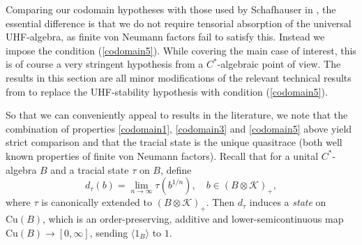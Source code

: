 \documentclass[reqno]{amsart}
\theoremstyle{definition}
\theoremstyle{remark}
\numberwithin{equation}{section}
\theoremstyle{definition}
\newcommand{\calK}{\mathcal{K}}
\begin{document}
Comparing our codomain hypotheses with those used by Schafhauser in \cite{Schafhauser.Annals}, the essential difference is that we do not require tensorial absorption of the universal UHF-algebra, as finite von Neumann factors fail to satisfy this. Instead we impose the condition (\ref{codomain5}). While covering the main case of interest, this is of course a very stringent hypothesis from a $C^*$-algebraic point of view.  The results in this section are all minor modifications of the relevant technical results from \cite{new-TWW,Schafhauser.Annals} to replace the UHF-stability hypothesis with condition (\ref{codomain5}).

So that we can conveniently appeal to results in the literature, we note that the combination of properties \eqref{codomain1}, \eqref{codomain3} and \eqref{codomain5} above yield strict comparison and that the tracial state is the unique quasitrace (both well known properties of finite von Neumann factors). Recall that for a unital $C^*$-algebra $B$ and a tracial state $\tau$ on $B$, define 
\begin{equation}
d_{\tau} (b) = \lim_{n\rightarrow \infty} \tau (b^{1/n}), \quad b\in (B\otimes \calK)_{+}, 
\end{equation} 
where $\tau$ is canonically extended to $(B\otimes \calK)_{+}$. Then $d_{\tau}$ induces a \emph{state} on $\mathrm{Cu}(B)$, which is an order-preserving, additive and lower-semicontinuous map $\mathrm{Cu}(B)\rightarrow [0,\infty]$, sending $\langle 1_{B} \rangle$ to $1$. 
\end{document}
